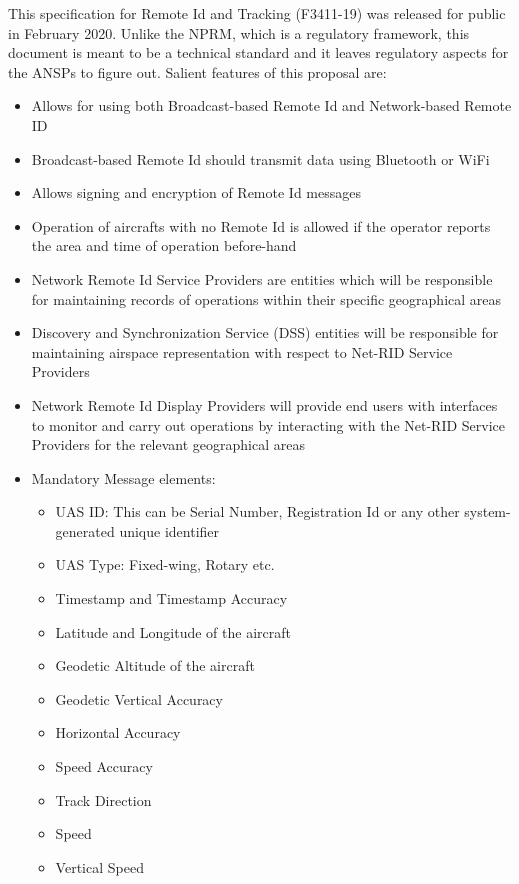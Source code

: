 \documentclass{ua_wgs_base}
\begin{document}
This specification for Remote Id and Tracking (F3411-19) \cite{ASTM:F3411:19}
was released for public in February 2020. Unlike the NPRM, which is
a regulatory framework, this document is meant to be a technical standard
and it leaves regulatory aspects for the ANSPs to figure out. Salient
features of this proposal are:
\begin{itemize}
\item Allows for using both Broadcast-based Remote Id and Network-based
Remote ID
\item Broadcast-based Remote Id should transmit data using Bluetooth or
WiFi
\item Allows signing and encryption of Remote Id messages
\item Operation of aircrafts with no Remote Id is allowed if the operator
reports the area and time of operation before-hand
\item Network Remote Id Service Providers are entities which will be responsible
for maintaining records of operations within their specific geographical
areas
\item Discovery and Synchronization Service (DSS) entities will be responsible
for maintaining airspace representation with respect to Net-RID Service
Providers
\item Network Remote Id Display Providers will provide end users with interfaces
to monitor and carry out operations by interacting with the Net-RID
Service Providers for the relevant geographical areas
\item Mandatory Message elements:
\begin{itemize}
\item UAS ID: This can be Serial Number, Registration Id or any other system-generated
unique identifier
\item UAS Type: Fixed-wing, Rotary etc.
\item Timestamp and Timestamp Accuracy
\item Latitude and Longitude of the aircraft
\item Geodetic Altitude of the aircraft
\item Geodetic Vertical Accuracy
\item Horizontal Accuracy
\item Speed Accuracy
\item Track Direction
\item Speed
\item Vertical Speed
\end{itemize}
\end{itemize}
\end{document}
